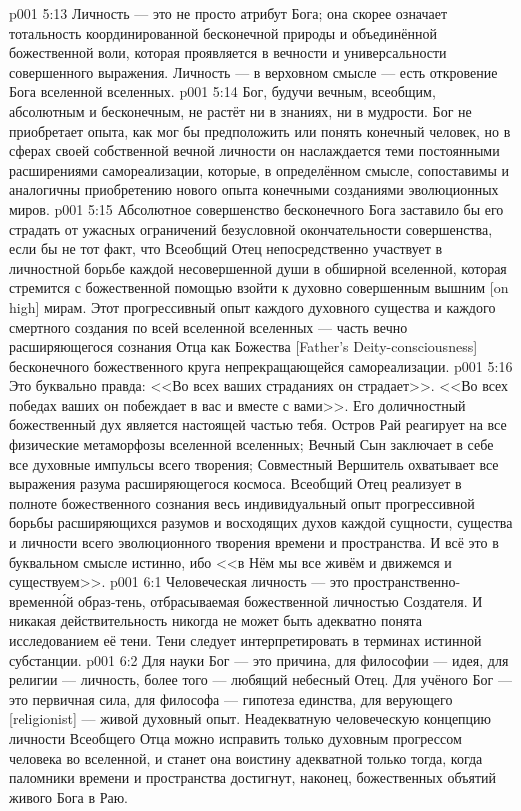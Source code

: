 \vs p001 5:13 \pc Личность --- это не просто атрибут Бога; она скорее означает тотальность координированной бесконечной природы и объединённой божественной воли, которая проявляется в вечности и универсальности совершенного выражения. Личность --- в верховном смысле --- есть откровение Бога вселенной вселенных.
\vs p001 5:14 \pc Бог, будучи вечным, всеобщим, абсолютным и бесконечным, не растёт ни в знаниях, ни в мудрости. Бог не приобретает опыта, как мог бы предположить или понять конечный человек, но в сферах своей собственной вечной личности он наслаждается теми постоянными расширениями самореализации, которые, в определённом смысле, сопоставимы и аналогичны приобретению нового опыта конечными созданиями эволюционных миров.
\vs p001 5:15 Абсолютное совершенство бесконечного Бога заставило бы его страдать от ужасных ограничений безусловной окончательности совершенства, если бы не тот факт, что Всеобщий Отец непосредственно участвует в личностной борьбе каждой несовершенной души в обширной вселенной, которая стремится с божественной помощью взойти к духовно совершенным вышним [on high] мирам. Этот прогрессивный опыт каждого духовного существа и каждого смертного создания по всей вселенной вселенных --- часть вечно расширяющегося сознания Отца как Божества [Father's Deity\hyp{}consciousness] бесконечного божественного круга непрекращающейся самореализации.
\vs p001 5:16 Это буквально правда: <<Во всех ваших страданиях он страдает>>. <<Во всех победах ваших он побеждает в вас и вместе с вами>>. Его доличностный божественный дух является настоящей частью тебя. Остров Рай реагирует на все физические метаморфозы вселенной вселенных; Вечный Сын заключает в себе все духовные импульсы всего творения; Совместный Вершитель охватывает все выражения разума расширяющегося космоса. Всеобщий Отец реализует в полноте божественного сознания весь индивидуальный опыт прогрессивной борьбы расширяющихся разумов и восходящих духов каждой сущности, существа и личности всего эволюционного творения времени и пространства. И всё это в буквальном смысле истинно, ибо <<в Нём мы все живём и движемся и существуем>>.
\vs p001 6:1 Человеческая личность --- это пространственно\hyp{}временн\'ой образ\hyp{}тень, отбрасываемая божественной личностью Создателя. И никакая действительность никогда не может быть адекватно понята исследованием её тени. Тени следует интерпретировать в терминах истинной субстанции.
\vs p001 6:2 \pc Для науки Бог --- это причина, для философии --- идея, для религии --- личность, более того --- любящий небесный Отец. Для учёного Бог --- это первичная сила, для философа --- гипотеза единства, для верующего [religionist] --- живой духовный опыт. Неадекватную человеческую концепцию личности Всеобщего Отца можно исправить только духовным прогрессом человека во вселенной, и станет она воистину адекватной только тогда, когда паломники времени и пространства достигнут, наконец, божественных объятий живого Бога в Раю.
